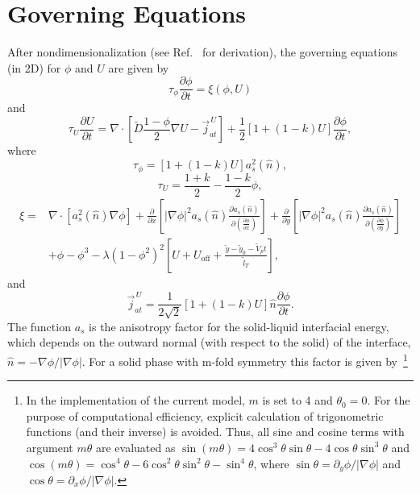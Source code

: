 \documentclass[10pt]{article}
\begin{document}
\section{Governing Equations}
After nondimensionalization (see Ref.~\cite{Echebarria2004} for derivation), the governing equations (in 2D) for $\phi$ and $U$ are given by
\begin{equation}
\label{eqphi}
\tau_\phi\frac{\partial  \phi}{\partial  t} = \xi(\phi,U)
\end{equation}
and 
\begin{equation}
\label{eqU}
\tau_U\frac{\partial  U}{\partial  t} = \nabla \cdot \left[ \tilde{D} \frac{1-\phi}{2} \nabla U - \vec{j}_{at}^{\,U} \right] + \frac{1}{2}[1+(1-k)U]\frac{\partial \phi}{\partial t},
\end{equation}
where
\begin{equation}
\label{tau_phi}
\tau_\phi=[1+(1-k) U ]a_s^2(\hat{n}),
\end{equation}
\begin{equation}
\tau_U=\frac{1+k}{2} - \frac{1-k}{2}\phi,
\label{tauU}
\end{equation}
\begin{equation}
\label{eqxi}
\begin{split}
\xi = & \nabla \cdot  \left[ a_s^2(\hat{n}) \nabla \phi \right] 
+  \frac{\partial}{\partial x} \left[ |\nabla \phi|^2 a_s(\hat{n}) \frac{\partial a_s(\hat{n})}{\partial \left( \frac{\partial \phi}{\partial x} \right)} \right]
+  \frac{\partial}{\partial y} \left[ |\nabla \phi|^2 a_s(\hat{n}) \frac{\partial a_s(\hat{n})}{\partial \left( \frac{\partial \phi}{\partial y} \right)} \right] \\
& +\phi-\phi^3 - \lambda(1-\phi^2)^2 \left[ U + U_\text{off} + \frac{\tilde{y} - \tilde{y}_0 - \tilde{V}_p t}{\tilde{l}_T} \right],
\end{split}
\end{equation}
and
\begin{equation}
\label{eqjat}
\vec{j}_{at}^{\,U}=\frac{1}{2\sqrt{2}}[1+(1-k)U]\hat{n}\frac{\partial \phi}{\partial t}.
\end{equation}
The function $a_s$ is the anisotropy factor for the solid-liquid interfacial energy, which depends on the outward normal (with respect to the solid) of the interface, $\hat{n}=-\nabla \phi / |\nabla \phi|$. For a solid phase with m-fold symmetry this factor is given by~\footnote{In the implementation of the current model, $m$ is set to 4 and  $\theta_0=0$. For the purpose of computational efficiency, explicit calculation of trigonometric functions (and their inverse) is avoided. Thus, all sine and cosine terms with argument $m\theta$ are evaluated as $\sin(m\theta)=4\cos^3\theta\sin\theta-4\cos\theta\sin^3\theta$ and $\cos(m\theta)=\cos^4\theta -6\cos^2\theta\sin^2\theta-\sin^4\theta$, where $\sin\theta=\partial_y\phi / |\nabla \phi|$ and $\cos\theta=\partial_x\phi / |\nabla \phi|$.}
\end{document}
